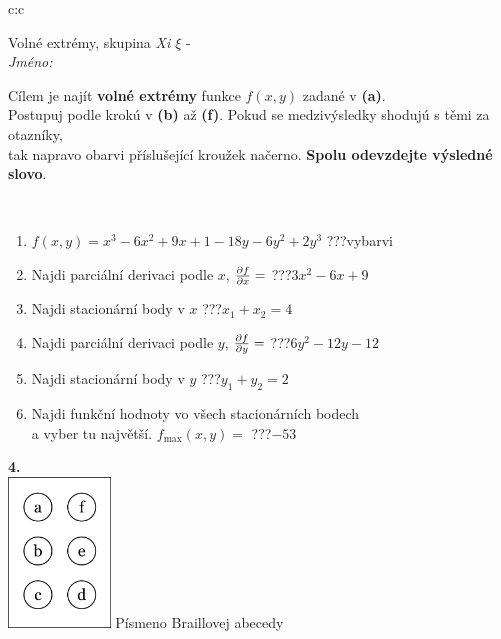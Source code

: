 \documentclass[10pt]{report}
\begin{document}
\begin{tabular}{c:c}
\begin{minipage}[c][104.5mm][t]{0.5\linewidth}
\begin{center}
\vspace{7mm}
{\huge Volné extrémy, skupina \textit{Xi $\xi$} -}\\[5mm]
\textit{Jméno:}\phantom{xxxxxxxxxxxxxxxxxxxxxxxxxxxxxxxxxxxxxxxxxxxxxxxxxxxxxxxxxxxxxxxxx}\\[5mm]
\begin{minipage}{0.95\linewidth}
\begin{center}
Cílem je najít \textbf{volné extrémy} funkce $f(x,y)$ zadané v \textbf{(a)}.\\Postupuj podle krokú v \textbf{(b)} až \textbf{(f)}. Pokud se medzivýsledky shodujú s těmi za otazníky,\\tak napravo obarvi příslušející kroužek načerno. \textbf{Spolu odevzdejte výsledné slovo}.
\end{center}
\end{minipage}
\\[1mm]
\begin{minipage}{0.79\linewidth}
\begin{center}
\begin{varwidth}{\linewidth}
\begin{enumerate}
\normalsize
\item $f(x,y)=x^3-6x^2+9x+1-18y-6y^2+2y^3$\quad \dotfill\; ???\;\dotfill \quad vybarvi
\item Najdi parciální derivaci podle $x$, $\pdv{f}{x}=$\quad \dotfill\; ???\;\dotfill \quad $3x^2-6x+9$
\item Najdi stacionární body v $x$\quad \dotfill\; ???\;\dotfill \quad $x_1+x_2=4$
\item Najdi parciální derivaci podle $y$, $\pdv{f}{y}=$\quad \dotfill\; ???\;\dotfill \quad $6y^2-12y-12$
\item Najdi stacionární body v $y$\quad \dotfill\; ???\;\dotfill \quad $y_1+y_2=2$
\item Najdi funkční hodnoty vo všech stacionárních bodech \\ \phantom{xxxxxx} a vyber tu najvětší. $f_{\text{max}}(x,y)=$\quad \dotfill\; ???\;\dotfill \quad $-53$
\end{enumerate}
\end{varwidth}
\end{center}
\end{minipage}
\begin{minipage}{0.20\linewidth}
\begin{center}
{\Huge\bfseries 4.} \\[2mm]
\includegraphics[height=40mm]{../images/braille.png}
{\small Písmeno Braillovej abecedy}
\end{center}
\end{minipage}
\end{center}
\end{minipage}
%
\end{tabular}
\end{document}

